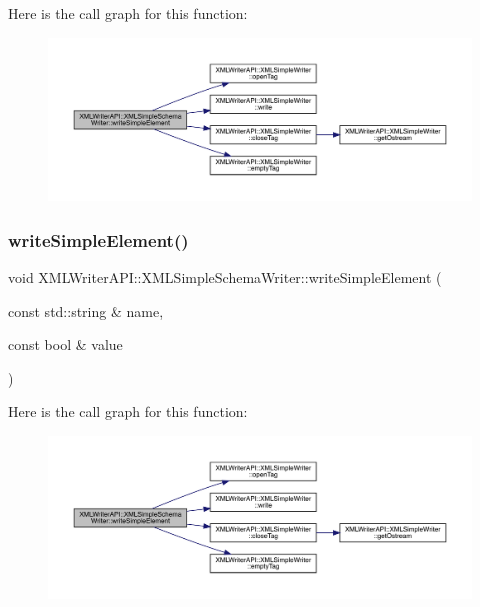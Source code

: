 Here is the call graph for this function\+:
\nopagebreak
\begin{figure}[H]
\begin{center}
\leavevmode
\includegraphics[width=350pt]{db/d0b/classXMLWriterAPI_1_1XMLSimpleSchemaWriter_aecd8faa2f1b2411dc108007c05bdb339_cgraph}
\end{center}
\end{figure}
\mbox{\label{classXMLWriterAPI_1_1XMLSimpleSchemaWriter_aecd8faa2f1b2411dc108007c05bdb339}} 
\subsubsection{\texorpdfstring{writeSimpleElement()}{writeSimpleElement()}\hspace{0.1cm}{\footnotesize\ttfamily [20/20]}}
{\footnotesize\ttfamily void X\+M\+L\+Writer\+A\+P\+I\+::\+X\+M\+L\+Simple\+Schema\+Writer\+::write\+Simple\+Element (\begin{DoxyParamCaption}\item[{const std\+::string \&}]{name,  }\item[{const bool \&}]{value }\end{DoxyParamCaption})\hspace{0.3cm}{\ttfamily [inline]}}

Here is the call graph for this function\+:
\nopagebreak
\begin{figure}[H]
\begin{center}
\leavevmode
\includegraphics[width=350pt]{db/d0b/classXMLWriterAPI_1_1XMLSimpleSchemaWriter_aecd8faa2f1b2411dc108007c05bdb339_cgraph}
\end{center}
\end{figure}


